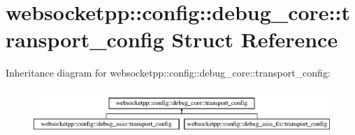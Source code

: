 \hypertarget{structwebsocketpp_1_1config_1_1debug__core_1_1transport__config}{}\section{websocketpp\+:\+:config\+:\+:debug\+\_\+core\+:\+:transport\+\_\+config Struct Reference}
\label{structwebsocketpp_1_1config_1_1debug__core_1_1transport__config}
Inheritance diagram for websocketpp\+:\+:config\+:\+:debug\+\_\+core\+:\+:transport\+\_\+config\+:\begin{figure}[H]
\begin{center}
\leavevmode
\includegraphics[height=1.739130cm]{structwebsocketpp_1_1config_1_1debug__core_1_1transport__config}
\end{center}
\end{figure}
